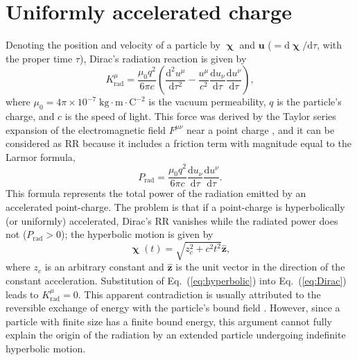 \documentclass[a4paper,fleqn]{cas-sc}
\begin{document}
\section{Uniformly accelerated charge}

Denoting the position and velocity of a particle by $\boldsymbol{\upchi}$ and $\mathbf{u}$ ($=\mathrm{d}\boldsymbol{\upchi}/\mathrm{d}\tau$, with the proper time $\tau$), Dirac's radiation reaction is given by
\begin{equation}
K_{\mathrm{rad}}^{\mu} = \displaystyle\frac{\mu_{0}q^{2}}{6\pi c} \left(\displaystyle\frac{\mathrm{d}^{2}u^{\mu}}{\mathrm{d}\tau^{2}} - \displaystyle\frac{u^{\mu}}{c^{2}} \displaystyle\frac{\mathrm{d}u_{\nu}}{\mathrm{d}\tau} \displaystyle\frac{\mathrm{d}u^{\nu}}{\mathrm{d}\tau}\right) , \label{eq:Dirac}
\end{equation}
where $\mu_{0} = 4\pi \times 10^{-7} \;\mathrm{kg}\cdot\mathrm{m}\cdot\mathrm{C}^{-2}$ is the vacuum permeability, $q$ is the particle's charge, and $c$ is the speed of light. This force was derived by the Taylor series expansion of the electromagnetic field $F^{\mu\nu}$ near a point charge \cite{Dirac1938}, and it can be considered as RR because it includes a friction term with magnitude equal to the Larmor formula,
\begin{equation}
P_{\mathrm{rad}} = \displaystyle\frac{\mu_{0}q^{2}}{6\pi c} \displaystyle\frac{\mathrm{d}u_{\nu}}{\mathrm{d}\tau} \displaystyle\frac{\mathrm{d}u^{\nu}}{\mathrm{d}\tau} .
\end{equation}
This formula represents the total power of the radiation emitted by an accelerated point-charge. The problem is that if a point-charge is hyperbolically (or uniformly) accelerated, Dirac's RR vanishes while the radiated power does not ($P_{\mathrm{rad}} > 0$); the hyperbolic motion is given by
\begin{equation}
\boldsymbol{\upchi}\left(t\right) = \sqrt{z_{c}^{2} + c^{2}t^{2}} \hat{\mathbf{z}} , \label{eq:hyperbolic}
\end{equation}
where $z_{c}$ is an arbitrary constant and $\hat{\mathbf{z}}$ is the unit vector in the direction of the constant acceleration. Substitution of Eq.~(\ref{eq:hyperbolic}) into Eq.~(\ref{eq:Dirac}) leads to $K_{\mathrm{rad}}^{\mu} = 0$. This apparent contradiction is usually attributed to the reversible exchange of energy with the particle's bound field \cite{Steane2015b}. However, since a particle with finite size has a finite bound energy, this argument cannot fully explain the origin of the radiation by an extended particle undergoing indefinite hyperbolic motion.
\end{document}
